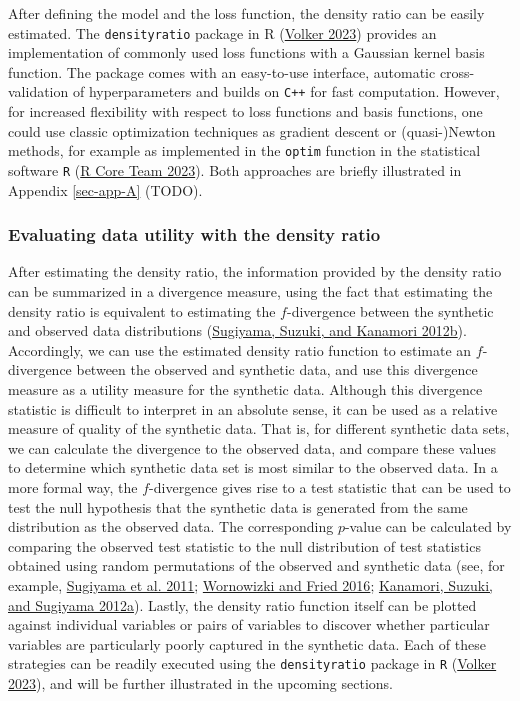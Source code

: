\documentclass[
]{article}
\begin{document}
After defining the model and the loss function, the density ratio can be
easily estimated. The \texttt{densityratio} package in R
(\protect\hyperlink{ref-densityratio}{Volker 2023}) provides an
implementation of commonly used loss functions with a Gaussian kernel
basis function. The package comes with an easy-to-use interface,
automatic cross-validation of hyperparameters and builds on \texttt{C++}
for fast computation. However, for increased flexibility with respect to
loss functions and basis functions, one could use classic optimization
techniques as gradient descent or (quasi-)Newton methods, for example as
implemented in the \texttt{optim} function in the statistical software
\texttt{R} (\protect\hyperlink{ref-R}{R Core Team 2023}). Both
approaches are briefly illustrated in Appendix \ref{sec-app-A} (TODO).

\hypertarget{evaluating-data-utility-with-the-density-ratio}{%
\subsubsection{Evaluating data utility with the density
ratio}\label{evaluating-data-utility-with-the-density-ratio}}

After estimating the density ratio, the information provided by the
density ratio can be summarized in a divergence measure, using the fact
that estimating the density ratio is equivalent to estimating the
\(f\)-divergence between the synthetic and observed data distributions
(\protect\hyperlink{ref-sugiyama_bregman_2012}{Sugiyama, Suzuki, and
Kanamori 2012b}). Accordingly, we can use the estimated density ratio
function to estimate an \(f\)-divergence between the observed and
synthetic data, and use this divergence measure as a utility measure for
the synthetic data. Although this divergence statistic is difficult to
interpret in an absolute sense, it can be used as a relative measure of
quality of the synthetic data. That is, for different synthetic data
sets, we can calculate the divergence to the observed data, and compare
these values to determine which synthetic data set is most similar to
the observed data. In a more formal way, the \(f\)-divergence gives rise
to a test statistic that can be used to test the null hypothesis that
the synthetic data is generated from the same distribution as the
observed data. The corresponding \(p\)-value can be calculated by
comparing the observed test statistic to the null distribution of test
statistics obtained using random permutations of the observed and
synthetic data (see, for example,
\protect\hyperlink{ref-sugiyama_lstst_2011}{Sugiyama et al. 2011};
\protect\hyperlink{ref-Wornowizki2016}{Wornowizki and Fried 2016};
\protect\hyperlink{ref-kanamori_divergence_2012}{Kanamori, Suzuki, and
Sugiyama 2012a}). Lastly, the density ratio function itself can be
plotted against individual variables or pairs of variables to discover
whether particular variables are particularly poorly captured in the
synthetic data. Each of these strategies can be readily executed using
the \texttt{densityratio} package in \texttt{R}
(\protect\hyperlink{ref-densityratio}{Volker 2023}), and will be further
illustrated in the upcoming sections.
\end{document}
